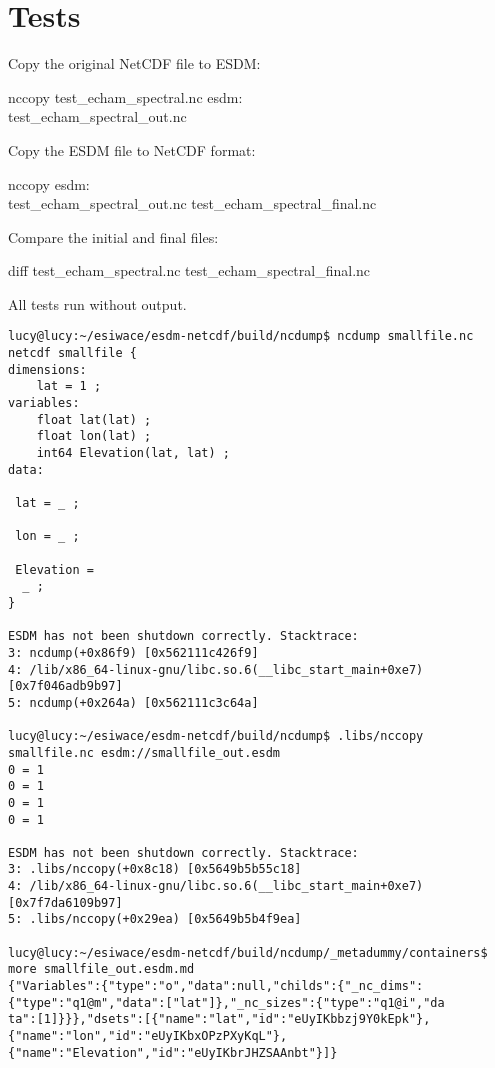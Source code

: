 {\section{Tests}

\tab
Copy the original NetCDF file to ESDM:

\begin{framed}
nccopy test\_echam\_spectral.nc esdm:\\test\_echam\_spectral\_out.nc
\end{framed}

Copy the ESDM file to NetCDF format:

\begin{framed}
nccopy esdm:\\test\_echam\_spectral\_out.nc test\_echam\_spectral\_final.nc
\end{framed}

Compare the initial and final files:

\begin{framed}
diff test\_echam\_spectral.nc test\_echam\_spectral\_final.nc
\end{framed}

All tests run without output.

\begin{verbatim}
lucy@lucy:~/esiwace/esdm-netcdf/build/ncdump$ ncdump smallfile.nc
netcdf smallfile {
dimensions:
	lat = 1 ;
variables:
	float lat(lat) ;
	float lon(lat) ;
	int64 Elevation(lat, lat) ;
data:

 lat = _ ;

 lon = _ ;

 Elevation =
  _ ;
}

ESDM has not been shutdown correctly. Stacktrace:
3: ncdump(+0x86f9) [0x562111c426f9]
4: /lib/x86_64-linux-gnu/libc.so.6(__libc_start_main+0xe7) [0x7f046adb9b97]
5: ncdump(+0x264a) [0x562111c3c64a]

lucy@lucy:~/esiwace/esdm-netcdf/build/ncdump$ .libs/nccopy smallfile.nc esdm://smallfile_out.esdm
0 = 1
0 = 1
0 = 1
0 = 1

ESDM has not been shutdown correctly. Stacktrace:
3: .libs/nccopy(+0x8c18) [0x5649b5b55c18]
4: /lib/x86_64-linux-gnu/libc.so.6(__libc_start_main+0xe7) [0x7f7da6109b97]
5: .libs/nccopy(+0x29ea) [0x5649b5b4f9ea]

lucy@lucy:~/esiwace/esdm-netcdf/build/ncdump/_metadummy/containers$ more smallfile_out.esdm.md
{"Variables":{"type":"o","data":null,"childs":{"_nc_dims":{"type":"q1@m","data":["lat"]},"_nc_sizes":{"type":"q1@i","da
ta":[1]}}},"dsets":[{"name":"lat","id":"eUyIKbbzj9Y0kEpk"},
{"name":"lon","id":"eUyIKbxOPzPXyKqL"},
{"name":"Elevation","id":"eUyIKbrJHZSAAnbt"}]}


\end{verbatim}}
